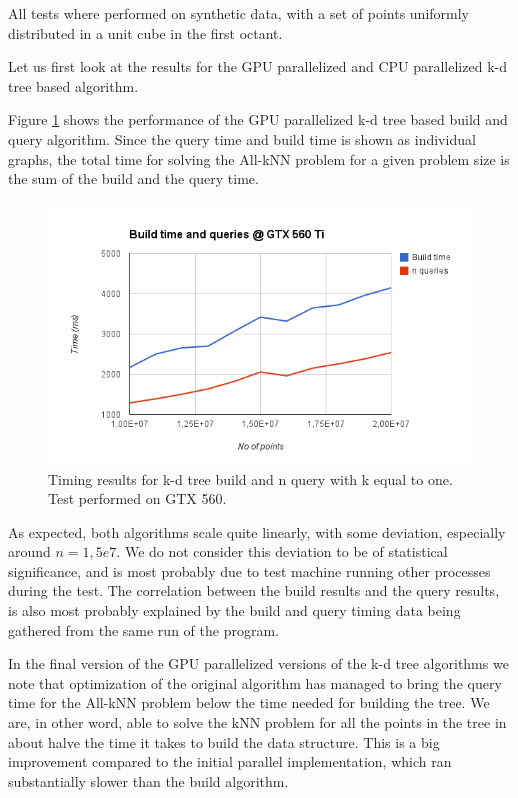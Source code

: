 All tests where performed on synthetic data, with a set of points uniformly distributed in a unit cube in the first octant.

Let us first look at the results for the GPU parallelized and CPU parallelized k-d tree based algorithm.

Figure \ref{fig:v17-gtx-560} shows the performance of the GPU parallelized k-d tree based build and query algorithm. Since the query time and build time is shown as individual graphs, the total time for solving the All-kNN problem for a given problem size is the sum of the build and the query time.

\begin{figure}[ht!]
    \centering
    \includegraphics[width=120mm]{../gfx/v17-gtx-560.png}
    \caption{Timing results for k-d tree build and n query with k equal to one. Test performed on GTX 560.}
    \label{fig:v17-gtx-560}
\end{figure}

As expected, both algorithms scale quite linearly, with some deviation, especially around $n=1,5e7$. We do not consider this deviation to be of statistical significance, and is most probably due to test machine running other processes during the test. The correlation between the build results and the query results, is also most probably explained by the build and query timing data being gathered from the same run of the program.

In the final version of the GPU parallelized versions of the k-d tree algorithms we note that optimization of the original algorithm has managed to bring the query time for the All-kNN problem below the time needed for building the tree. We are, in other word, able to solve the kNN problem for all the points in the tree in about halve the time it takes to build the data structure. This is a big improvement compared to the initial parallel implementation, which ran substantially slower than the build algorithm.

